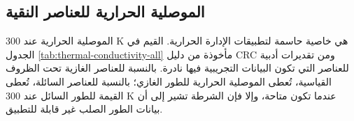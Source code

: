 \documentclass[11pt,a4paper]{article}
\begin{document}
	\begin{otherlanguage}{arabic}
		
		\subsection{الموصلية الحرارية للعناصر النقية}
		\label{subsec:thermal-conductivity-elements}
		
		الموصلية الحرارية عند 300 K هي خاصية حاسمة لتطبيقات الإدارة الحرارية. القيم في الجدول \ref{tab:thermal-conductivity-all} مأخوذة من دليل CRC \cite{CRC} ومن تقديرات أدبية للعناصر التي تكون البيانات التجريبية فيها نادرة. بالنسبة للعناصر الغازية تحت الظروف القياسية، تُعطى الموصلية الحرارية للطور الغازي؛ بالنسبة للعناصر السائلة، تُعطى القيمة للطور السائل عند 300 K عندما تكون متاحة، وإلا فإن الشرطة تشير إلى أن بيانات الطور الصلب غير قابلة للتطبيق.
		

\end{otherlanguage}
\end{document}

